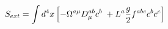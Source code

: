 \begin{equation}
S_{ext}=\int d^{4}x\left[ -\Omega ^{a\mu }D_{\mu }^{ab}c^{b}\;+L^{a}\frac{g}{%
2}f^{abc}c^{b}c^{c}\right]  \label{om}
\end{equation}

